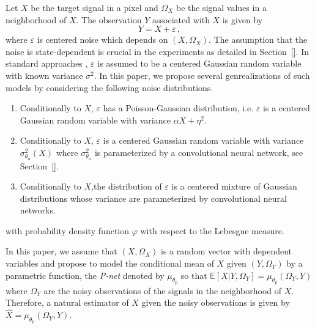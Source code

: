 \documentclass{article}
\begin{document}
Let $X$ be the target signal in a pixel and $\Omega_X$ be the signal values in a neighborhood of $X$.  The observation $Y$ associated with $X$  is given by
\begin{equation}
\label{eq:def:Y}
Y = X + \varepsilon\,,
\end{equation}
where $\varepsilon$ is centered noise which depends on $(X,\Omega_X)$. The assumption that the noise is state-dependent is crucial in the experiments as detailed in Section~\ref{}. In standard approaches \cite{},  $\varepsilon$ is assumed to be a centered Gaussian random variable with known variance $\sigma^2$. In this paper, we propose several genrealizations of such models by considering the following noise distributions.
\begin{enumerate}
\item Conditionally to $X$, $\varepsilon$ has a Poisson-Gaussian distribution, i.e. $\varepsilon$ is a centered Gaussian random variable with variance $\alpha X + \eta^2$.
\item Conditionally to $X$, $\varepsilon$ is a centered Gaussian random variable with variance $\sigma^2_{\theta_n}(X)$ where $\sigma^2_{\theta_n}$ is parameterized by a convolutional neural network, see Section~\ref{}.
\item Conditionally to $X$,the distribution of  $\varepsilon$ is a centered mixture of Gaussian distributions whose variance are parameterized by convolutional neural networks.
\end{enumerate}


 with probability density function $\varphi$ with respect to the Lebesgue measure. 

In this paper, we assume that $(X,\Omega_X)$ is a random vector with dependent variables and propose to model the conditional mean of $X$ given $(Y,\Omega_Y)$ by a parametric function, the {\em P-net} denoted by $\mu_{\theta_p}$ so that $\mathbb{E}[X|Y,\Omega_Y] = \mu_{\theta_p}(\Omega_Y,Y)$ where $\Omega_Y$ are the noisy observations of the signals in the neighborhood of $X$. Therefore, a natural estimator of $X$ given the noisy observations is given by $\widehat X = \mu_{\theta_p}(\Omega_Y,Y)$.
\end{document}
